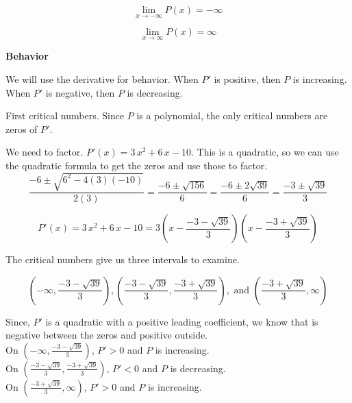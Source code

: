 \documentclass{ximera}
\begin{document}
\[
\lim\limits_{x \to -\infty} P(x) = -\infty 
\]




\[
\lim\limits_{x \to \infty} P(x) = \infty 
\]


















\textbf{Behavior}

We will use the derivative for behavior. When $P'$ is positive, then $P$ is increasing.  When $P'$ is negative, then $P$ is decreasing.  


First critical numbers.  Since $P$ is a polynomial, the only critical numbers are zeros of $P'$.  


We need to factor. $P'(x) = 3 \, x^2 + 6 \, x - 10$.  This is a quadratic, so we can use the quadratic formula to get  the zeros and use those to factor. \\


\[
\frac{-6 \pm \sqrt{6^2 - 4 (3)(-10)}}{2(3)} = \frac{-6 \pm \sqrt{156}}{6} = \frac{-6 \pm 2\sqrt{39}}{6} = \frac{-3 \pm \sqrt{39}}{3}
\]




\[
P'(x) = 3 \, x^2 + 6 \, x - 10 = 3 \left( x - \frac{-3 - \sqrt{39}}{3} \right) \left( x - \frac{-3 + \sqrt{39}}{3}  \right)
\]



The critical numbers give us three intervals to examine.

\[
\left( -\infty, \frac{-3 - \sqrt{39}}{3} \right), \left( \frac{-3 - \sqrt{39}}{3}, \frac{-3 + \sqrt{39}}{3} \right), \text{ and } \left( \frac{-3 + \sqrt{39}}{3}, \infty \right)
\]


Since, $P'$ is a quadratic with a positive leading coefficient, we know that is negative between the zeros and positive outside. \\



On $\left( -\infty, \frac{-3 - \sqrt{39}}{3} \right)$, $P' > 0$ and $P$ is increasing. \\


On $\left( \frac{-3 - \sqrt{39}}{3}, \frac{-3 + \sqrt{39}}{3} \right)$, $P' < 0$ and $P$ is decreasing. \\


On $\left( \frac{-3 + \sqrt{39}}{3}, \infty \right)$, $P' > 0$ and $P$ is increasing. \\
\end{document}
